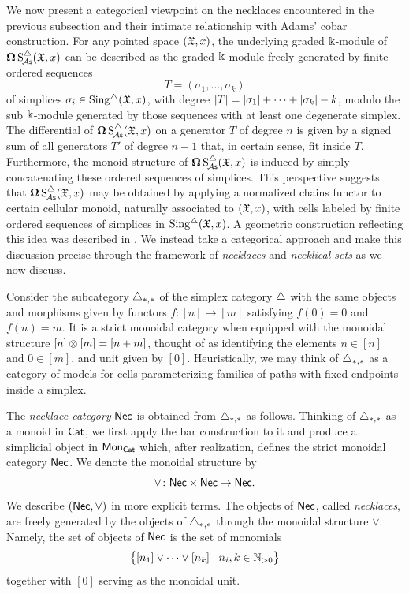 We now present a categorical viewpoint on the necklaces encountered in the previous subsection and their intimate relationship with Adams' cobar construction.
For any pointed space $(\mathfrak{X},x)$, the underlying graded $\Bbbk$-module of $\operatorname{\mathbf{\Omega}} \operatorname{S^{\triangle}_{\!{\mathcal{A}\mathsf{s}}}}(\mathfrak{X},x)$ can be described as the graded $\Bbbk$-module freely generated by finite ordered sequences
\[
T = (\sigma_1, \dots, \sigma_k)
\]
of simplices $\sigma_i \in \operatorname{Sing^{\triangle}}(\mathfrak{X},x)$, with degree $\lvert T\rvert = \lvert\sigma_1\rvert+\dots+\lvert\sigma_k\rvert - k$, modulo the sub $\Bbbk$-module generated by those sequences with at least one degenerate simplex.
The differential of $\operatorname{\mathbf{\Omega}} \operatorname{S^{\triangle}_{\!{\mathcal{A}\mathsf{s}}}}(\mathfrak{X},x)$ on a generator $T$ of degree $n$ is given by a signed sum of all generators $T'$ of degree $n-1$ that, in certain sense, fit inside $T$.
Furthermore, the monoid structure of $\operatorname{\mathbf{\Omega}} \operatorname{S^{\triangle}_{\!{\mathcal{A}\mathsf{s}}}}(\mathfrak{X},x)$ is induced by simply concatenating these ordered sequences of simplices.
This perspective suggests that $\operatorname{\mathbf{\Omega}} \operatorname{S^{\triangle}_{\!{\mathcal{A}\mathsf{s}}}}(\mathfrak{X},x)$ may be obtained by applying a normalized chains functor to certain cellular monoid, naturally associated to $(\mathfrak{X},x)$, with cells labeled by finite ordered sequences of simplices in $\operatorname{Sing^{\triangle}}(\mathfrak{X},x)$.
A geometric construction reflecting this idea was described in \cite{baues1980geometry}.
We instead take a categorical approach and make this discussion precise through the framework of \textit{necklaces} and \textit{necklical sets} as we now discuss.

Consider the subcategory $\triangle_{*,*}$ of the simplex category $\triangle$ with the same objects and morphisms given by functors $f \colon [n] \to [m]$ satisfying $f(0) = 0$ and $f(n) = m$.
It is a strict monoidal category when equipped with the monoidal structure $[n] \otimes [m] = [n+m]$, thought of as identifying the elements $n \in [n]$ and $0 \in [m]$, and unit given by $[0]$.
Heuristically, we may think of $\triangle_{*,*}$ as a category of models for cells parameterizing families of paths with fixed endpoints inside a simplex.

The \textit{necklace category} $\mathsf{Nec}$ is obtained from $\triangle_{*,*}$ as follows.
Thinking of $\triangle_{*,*}$ as a monoid in $\mathsf{Cat}$, we first apply the bar construction to it and produce a simplicial object in $\mathsf{Mon}_{\mathsf{Cat}}$ which, after realization, defines the strict monoidal category $\mathsf{Nec}$.
We denote the monoidal structure by
\[
\vee \colon \mathsf{Nec} \times \mathsf{Nec} \to \mathsf{Nec}.
\]
We describe $(\mathsf{Nec}, \vee)$ in more explicit terms.
The objects of $\mathsf{Nec}$, called \textit{necklaces}, are freely generated by the objects of $\triangle_{*,*}$ through the monoidal structure $\vee$.
Namely, the set of objects of $\mathsf{Nec}$ is the set of monomials
\[
\big\{ [n_1] \vee \dots \vee[n_k] \mid n_i, k \in \mathbb{N}_{>0} \big\}
\]
together with $[0]$ serving as the monoidal unit.

